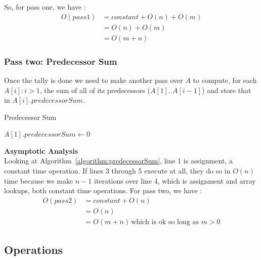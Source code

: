 \documentclass[letterpaper, 10pt,DIV=13]{scrartcl}
\numberwithin{equation}{section} %
\numberwithin{figure}{section} %
\numberwithin{table}{section} %
\begin{document}

So, for pass one, we have :
\begin{equation}   
   \label{equation:pass1}   
   \begin{split}
   O(pass1) & = constant + O(n) + O(m)\\
            & = O(n) + O(m)\\
            & = O(m+n)   
   \end{split}
\end{equation}

\subsubsection{Pass two: Predecessor Sum}
Once the tally is done we need to make another pass over $A$ to compute, for each $A[i] : i>1$, 
the sum of all of its predecessors ($A[1] .. A[i-1]$) and store that in $A[i].predecessorSum$.

\begin{algorithm}[H]
    \SetAlgoLined
    \caption{Predecessor Sum}
    \label{algorithm:predecessorSum}
   
    $A[1].predecessorSum \leftarrow 0$\;
    {
   }
\end{algorithm}

\textbf{Asymptotic Analysis}\\
Looking at Algorithm~\ref{algorithm:predecessorSum}, line 1 is assignment, a constant time operation.
If lines 3 through 5 execute at all, they do so in $O(n)$ time because we make $n - 1$ iterations over line 4, which is assignment and array lookups, both constant time operations.
For pass two, we have :
\begin{equation}
   \label{equation:pass2}   
   \begin{split}       
       O(pass2) & = constant + O(n) \\
                & = O(n) \\
                & = O(m+n) \, \text{which is ok so long as $m > 0$}   
    \end{split}
\end{equation}


\subsection{Operations}\label{operations}
\end{document}
